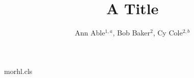 \begin{filecontents*}[overwrite]{morhl.cls}
\def\@aabuffer{}
\def\author#1{\expandafter\def\expandafter\@aabuffer\expandafter{\@aabuffer \small\rm #1\relax \par}}
\def\address#1{\expandafter\def\expandafter\@aabuffer\expandafter{\@aabuffer \small\it #1\relax \par\vspace{1em}}}
\def\maketitle{\begin{center}{\bf \@title \par}\vskip 2em\@aabuffer\relax\end{center}\par\gdef\@aabuffer{}}
\end{filecontents*}
\documentclass{morhl}

\title{A Title}
\author{Ann Able$^{1,a}$, Bob Baker$^{2}$, Cy Cole$^{2,b}$}
\address{$^{1}$ Univ A, Town.
$^{2}$ Univ B, City.\\
a) also at Lab X, Place
b) now at Lab Y, Place
}
\maketitle
Text.


